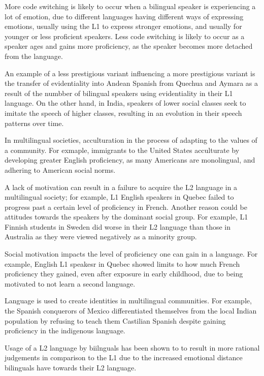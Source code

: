 \documentclass{article}
\begin{document}
\clearpage

\problem
More code switching is likely to occur when a bilingual speaker is experiencing a lot of emotion, due to different languages having different ways of expressing emotions, usually using the L1 to express stronger emotions, and usually for younger or less proficient speakers. Less code switching is likely to occur as a speaker ages and gains more proficiency, as the speaker becomes more detached from the language.

\clearpage

\problem
An example of a less prestigious variant influencing a more prestigious variant is the transfer of evidentiality into Andean Spanish from Quechua and Aymara as a result of the numbber of bilingual speakers using evidentiality in their L1 language. On the other hand, in India, speakers of lower social classes seek to imitate the speech of higher classes, resulting in an evolution in their speech patterns over time.


\clearpage

\problem
In multilingual societies, acculturation in the process of adapting to the values of a community. For exmaple, immigrants to the United States acculturate by developing greater English proficiency, as many Americans are monolingual, and adhering to American social norms.

\clearpage

\problem
A lack of motivation can result in a failure to acquire the L2 language in a multilingual society; for example, L1 English speakers in Quebec failed to progress past a certain level of proficiency in French. Another reason could be attitudes towards the speakers by the dominant social group. For example, L1 Finnish students in Sweden did worse in their L2 language than those in Australia as they were viewed negatively as a minority group.

\clearpage

\problem
Social motivation impacts the level of proficiency one can gain in a language. For example, English L1 speakesr in Quebec showed limits to how much French proficiency they gained, even after exposure in early childhood, due to being motivated to not learn a second language.

\clearpage

\problem
Language is used to create identities in multilingual communities. For example, the Spanish conquerors of Mexico differentiated themselves from the local Indian population by refusing to teach them Castilian Spanish despite gaining proficiency in the indigenous language.

\clearpage

\problem
Usage of a L2 language by biilnguals has been shown to to result in more rational judgements in comparison to the L1 due to the increased emotional distance bilinguals have towards their L2 language.
\end{document}
